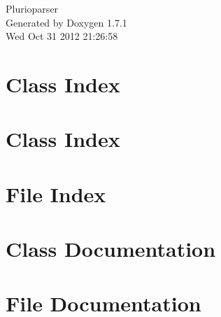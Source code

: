 \documentclass[a4paper]{book}
\begin{document}
\hypersetup{pageanchor=false}
\begin{titlepage}
\vspace*{7cm}
\begin{center}
{\Large Plurioparser }\\
\vspace*{1cm}
{\large Generated by Doxygen 1.7.1}\\
\vspace*{0.5cm}
{\small Wed Oct 31 2012 21:26:58}\\
\end{center}
\end{titlepage}
\clearemptydoublepage
{}
\tableofcontents
\clearemptydoublepage
{}
\hypersetup{pageanchor=true}
\chapter{Class Index}

\chapter{Class Index}

\chapter{File Index}

\chapter{Class Documentation}
















\chapter{File Documentation}









\printindex
\end{document}
